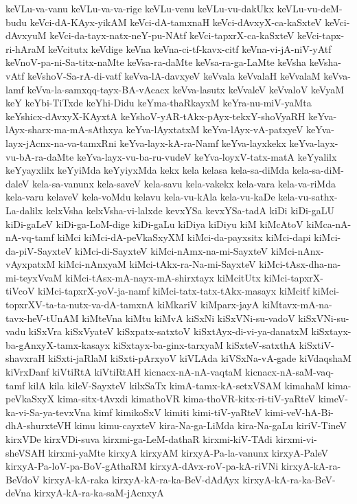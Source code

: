 {keVLu-va-vanu
keVLu-va-va-rige
keVLu-venu
keVLu-vu-dakUkx
keVLu-vu-deM-budu
keVci-dA-KAyx-yikAM
keVci-dA-tamxnaH
keVci-dAvxyX-ca-kaSxteV
keVci-dAvxyuM
keVci-da-tayx-natx-neY-pu-NAtf
keVci-tapxrX-ca-kaSxteV
keVci-tapx-ri-hAraM
keVcitutx
keVdige
keVna
keVna-ci-tf-kavx-citf
keVna-vi-jA-niV-yAtf
keVnoV-pa-ni-Sa-titx-naMte
keVsa-ra-daMte
keVsa-ra-ga-LaMte
keVsha
keVsha-vAtf
keVshoV-Sa-rA-di-vatf
keVva-lA-davxyeV
keVvala
keVvalaH
keVvalaM
keVva-lamf
keVva-la-samxqq-tayx-BA-vAcacx
keVva-lasutx
keVvaleV
keVvaloV
keVyaM
keY
keYbi-TiTxde
keYhi-Didu
keYma-thaRkayxM
keYra-nu-miV-yaMta
keYshicx-dAvxyX-KAyxtA
keYshoV-yAR-tAkx-pAyx-tekxY-shoVyaRH
keYva-lAyx-sharx-ma-mA-sAthxya
keYva-lAyxtatxM
keYva-lAyx-vA-patxyeV
keYva-layx-jAcnx-na-va-tamxRni
keYva-layx-kA-ra-Namf
keYva-layxkekx
keYva-layx-vu-bA-ra-daMte
keYva-layx-vu-ba-ru-vudeV
keYva-loyxV-tatx-matA
keYyalilx
keYyayxlilx
keYyiMda
keYyiyxMda
kekx
kela
kelasa
kela-sa-diMda
kela-sa-diM-daleV
kela-sa-vanunx
kela-saveV
kela-savu
kela-vakekx
kela-vara
kela-va-riMda
kela-varu
kelaveV
kela-voMdu
kelavu
kela-vu-kAla
kela-vu-kaDe
kela-vu-sathx-La-dalilx
kelxVsha
kelxVsha-vi-lalxde
kevxYSa
kevxYSa-tadA
kiDi
kiDi-gaLU
kiDi-gaLeV
kiDi-ga-LoM-dige
kiDi-gaLu
kiDiya
kiDiyu
kiM
kiMcAtoV
kiMca-nA-nA-vq-tamf
kiMci
kiMci-dA-peVkaSxyXM
kiMci-da-payxsitx
kiMci-dapi
kiMci-da-piV-SayxteV
kiMci-di-SayxteV
kiMci-nAmx-na-mi-SayxteV
kiMci-nAnx-vAyxpatxM
kiMci-nAnxyaM
kiMci-tAkx-ra-Na-mi-SayxteV
kiMci-tAsx-dha-na-mi-teyxVvaM
kiMci-tAsx-mA-nayx-mA-shirxtayx
kiMcitUtx
kiMci-tapxrX-tiVcoV
kiMci-tapxrX-yoV-ja-namf
kiMci-tatx-tatx-tAkx-masayx
kiMcitf
kiMci-topxrXV-ta-ta-nutx-va-dA-tamxnA
kiMkariV
kiMparx-jayA
kiMtavx-mA-na-tavx-heV-tUnAM
kiMteVna
kiMtu
kiMvA
kiSxNi
kiSxVNi-su-vadoV
kiSxVNi-su-vadu
kiSxVra
kiSxVyateV
kiSxpatx-satxtoV
kiSxtAyx-di-vi-ya-danatxM
kiSxtayx-ba-gAnxyX-tamx-kasayx
kiSxtayx-ba-ginx-tarxyaM
kiSxteV-satxthA
kiSxtiV-shavxraH
kiSxti-jaRlaM
kiSxti-pArxyoV
kiVLAda
kiVSxNa-vA-gade
kiVdaqshaM
kiVrxDanf
kiVtiRtA
kiVtiRtAH
kicnacx-nA-nA-vaqtaM
kicnacx-nA-saM-vaq-tamf
kilA
kila
kileV-SayxteV
kilxSaTx
kimA-tamx-kA-setxVSAM
kimahaM
kima-peVkaSxyX
kima-sitx-tAvxdi
kimathoVR
kima-thoVR-kitx-ri-tiV-yaRteV
kimeV-ka-vi-Sa-ya-tevxVna
kimf
kimikoSxV
kimiti
kimi-tiV-yaRteV
kimi-veV-hA-Bi-dhA-shurxteVH
kimu
kimu-cayxteV
kira-Na-ga-LiMda
kira-Na-gaLu
kiriV-TineV
kirxVDe
kirxVDi-suva
kirxmi-ga-LeM-dathaR
kirxmi-kiV-TAdi
kirxmi-vi-sheVSAH
kirxmi-yaMte
kirxyA
kirxyAM
kirxyA-Pa-la-vanunx
kirxyA-PaleV
kirxyA-Pa-loV-pa-BoV-gAthaRM
kirxyA-dAvx-roV-pa-kA-riVNi
kirxyA-kA-ra-BeVdoV
kirxyA-kA-raka
kirxyA-kA-ra-ka-BeV-dAdAyx
kirxyA-kA-ra-ka-BeV-deVna
kirxyA-kA-ra-ka-saM-jAcnxyA
}
